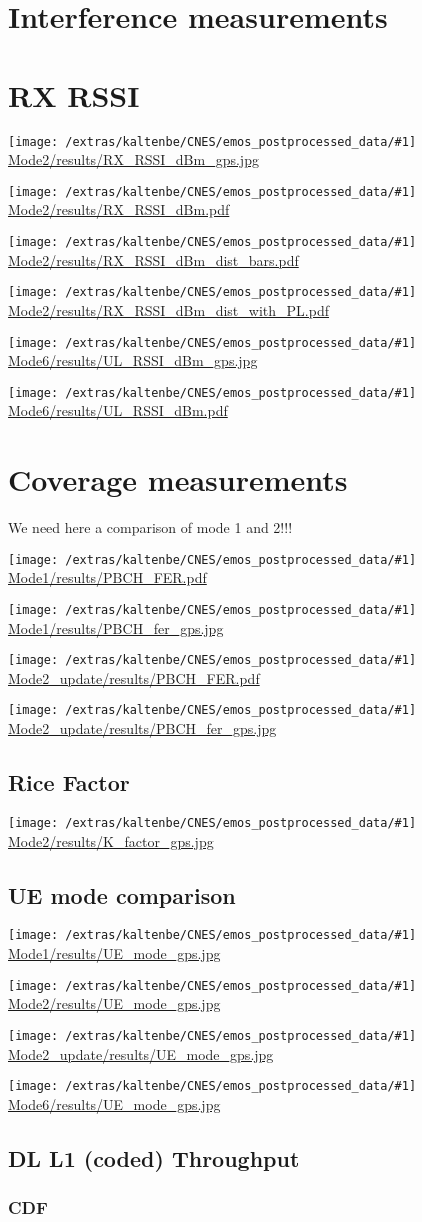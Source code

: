 \documentclass[a4paper,10pt]{article}
\newcommand{\printfile}[1]{
 \begin{minipage}{8cm}
  \centering
  \texttt{[image: /extras/kaltenbe/CNES/emos\_postprocessed\_data/\#1]}
  \url{#1}

 \end{minipage}
}
\begin{document}
\section{Interference measurements}


\section{RX RSSI}
\printfile{Mode2/results/RX_RSSI_dBm_gps.jpg}
\printfile{Mode2/results/RX_RSSI_dBm.pdf}

\printfile{Mode2/results/RX_RSSI_dBm_dist_bars.pdf}
\printfile{Mode2/results/RX_RSSI_dBm_dist_with_PL.pdf}

\printfile{Mode6/results/UL_RSSI_dBm_gps.jpg}
\printfile{Mode6/results/UL_RSSI_dBm.pdf}


\section{Coverage measurements}
We need here a comparison of mode 1 and 2!!!

\printfile{Mode1/results/PBCH_FER.pdf}
\printfile{Mode1/results/PBCH_fer_gps.jpg}

\printfile{Mode2_update/results/PBCH_FER.pdf}
\printfile{Mode2_update/results/PBCH_fer_gps.jpg}


\subsection{Rice Factor}

\printfile{Mode2/results/K_factor_gps.jpg}

\subsection{UE mode comparison}
\printfile{Mode1/results/UE_mode_gps.jpg}
\printfile{Mode2/results/UE_mode_gps.jpg}

\printfile{Mode2_update/results/UE_mode_gps.jpg}
\printfile{Mode6/results/UE_mode_gps.jpg}

\subsection{DL L1 (coded) Throughput}

\subsubsection{CDF}
\end{document}
